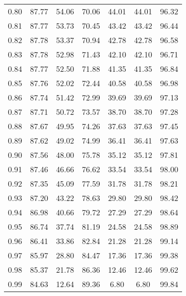 \begin{tabular}{|c|c|c|c|c|c|c|}
      0.80 &     87.77 &     54.06 &      70.06 &   44.01 &      44.01 &         96.32 \\
      0.81 &     87.77 &     53.73 &      70.45 &   43.42 &      43.42 &         96.44 \\
      0.82 &     87.78 &     53.37 &      70.94 &   42.78 &      42.78 &         96.58 \\
      0.83 &     87.78 &     52.98 &      71.43 &   42.10 &      42.10 &         96.71 \\
      0.84 &     87.77 &     52.50 &      71.88 &   41.35 &      41.35 &         96.84 \\
      0.85 &     87.76 &     52.02 &      72.44 &   40.58 &      40.58 &         96.98 \\
      0.86 &     87.74 &     51.42 &      72.99 &   39.69 &      39.69 &         97.13 \\
      0.87 &     87.71 &     50.72 &      73.57 &   38.70 &      38.70 &         97.28 \\
      0.88 &     87.67 &     49.95 &      74.26 &   37.63 &      37.63 &         97.45 \\
      0.89 &     87.62 &     49.02 &      74.99 &   36.41 &      36.41 &         97.63 \\
      0.90 &     87.56 &     48.00 &      75.78 &   35.12 &      35.12 &         97.81 \\
      0.91 &     87.46 &     46.66 &      76.62 &   33.54 &      33.54 &         98.00 \\
      0.92 &     87.35 &     45.09 &      77.59 &   31.78 &      31.78 &         98.21 \\
      0.93 &     87.20 &     43.22 &      78.63 &   29.80 &      29.80 &         98.42 \\
      0.94 &     86.98 &     40.66 &      79.72 &   27.29 &      27.29 &         98.64 \\
      0.95 &     86.74 &     37.74 &      81.19 &   24.58 &      24.58 &         98.89 \\
      0.96 &     86.41 &     33.86 &      82.84 &   21.28 &      21.28 &         99.14 \\
      0.97 &     85.97 &     28.80 &      84.47 &   17.36 &      17.36 &         99.38 \\
      0.98 &     85.37 &     21.78 &      86.36 &   12.46 &      12.46 &         99.62 \\
      0.99 &     84.63 &     12.64 &      89.36 &    6.80 &       6.80 &         99.84 \\
\bottomrule
\end{tabular}
